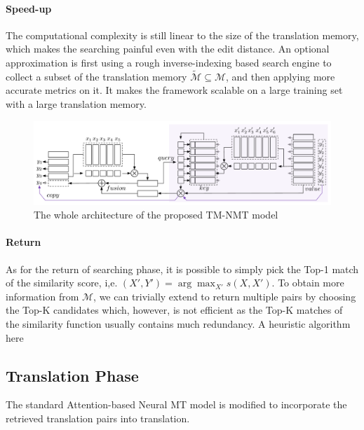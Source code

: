 \documentclass[11pt,letterpaper]{article}
\begin{document}
\paragraph{Speed-up} The computational complexity is still linear to the size of the translation memory, which makes the searching painful even with the edit distance. An optional approximation is first using a rough inverse-indexing based search engine to collect a subset of the translation memory $\tilde{\mathcal{M}}\subseteq \mathcal{M}$, and then applying more accurate metrics on it. It makes the framework scalable on a large training set with a large translation memory. 
\begin{figure}[htpb]
\label{framework}
\includegraphics[width=\linewidth]{figures/framework1.pdf}
\caption{\label{fig.tmnmt}The whole architecture of the proposed TM-NMT model}
\end{figure}

\paragraph{Return}
As for the return of searching phase, it is possible to simply pick the Top-1 match of the similarity score, i,e. $(X', Y')=\arg\max_{X'}s(X, X')$.  To obtain more information from $\mathcal{M}$, we can trivially extend to return multiple pairs by choosing the Top-K candidates which, however, is not efficient as the Top-K matches of the similarity function usually contains much redundancy.
A heuristic algorithm here

\subsection{Translation Phase}
The standard Attention-based Neural MT model is modified to incorporate the retrieved translation pairs into translation. 
\end{document}
